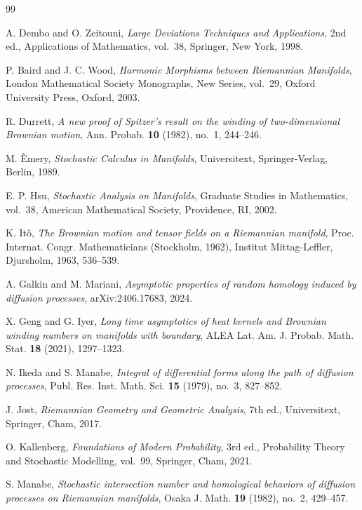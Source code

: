 \documentclass[a4paper,reqno]{amsart}
\theoremstyle{definition}
\begin{document}
\begin{thebibliography}{99}

A. Dembo and O. Zeitouni,
\emph{Large Deviations Techniques and Applications},
2nd ed., Applications of Mathematics, vol.~38, Springer, New York, 1998.

P. Baird and J. C. Wood,
\emph{Harmonic Morphisms between Riemannian Manifolds},
London Mathematical Society Monographs, New Series, vol.~29,
Oxford University Press, Oxford, 2003.

R. Durrett,
\emph{A new proof of Spitzer's result on the winding of two-dimensional Brownian motion},
Ann. Probab. \textbf{10} (1982), no.~1, 244--246.

M. \`Emery,
\emph{Stochastic Calculus in Manifolds},
Universitext, Springer-Verlag, Berlin, 1989.

E. P. Hsu,
\emph{Stochastic Analysis on Manifolds},
Graduate Studies in Mathematics, vol.~38, American Mathematical Society, Providence, RI, 2002.


K. It\^o,
\emph{The Brownian motion and tensor fields on a Riemannian manifold},
Proc. Internat. Congr. Mathematicians (Stockholm, 1962),
Institut Mittag-Leffler, Djursholm, 1963, 536--539.

A. Galkin and M. Mariani,
\emph{Asymptotic properties of random homology induced by diffusion processes},
arXiv:2406.17683, 2024.

X. Geng and G. Iyer,
\emph{Long time asymptotics of heat kernels and Brownian winding numbers on manifolds with boundary},
ALEA Lat. Am. J. Probab. Math. Stat. \textbf{18} (2021), 1297--1323.

N. Ikeda and S. Manabe,
\emph{Integral of differential forms along the path of diffusion processes},
Publ. Res. Inst. Math. Sci. \textbf{15} (1979), no.~3, 827--852.

J. Jost,
\emph{Riemannian Geometry and Geometric Analysis},
7th ed., Universitext, Springer, Cham, 2017.

O. Kallenberg,
\emph{Foundations of Modern Probability},
3rd ed., Probability Theory and Stochastic Modelling, vol.~99,
Springer, Cham, 2021.

S. Manabe,
\emph{Stochastic intersection number and homological behaviors of diffusion processes on Riemannian manifolds},
Osaka J. Math. \textbf{19} (1982), no.~2, 429--457.


\end{thebibliography}
\end{document}
